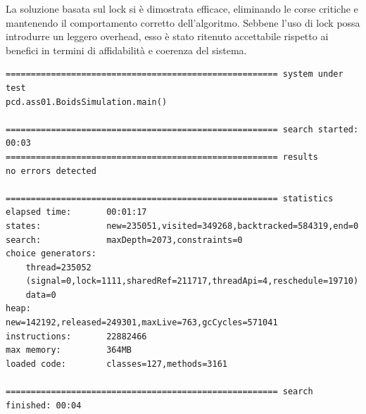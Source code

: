 \documentclass[a4paper,12pt]{report}
\begin{document}
La soluzione basata sul lock si è dimostrata efficace, eliminando le corse critiche e mantenendo il comportamento corretto dell'algoritmo. Sebbene l'uso di lock possa introdurre un leggero overhead, esso è stato ritenuto accettabile rispetto ai benefici in termini di affidabilità e coerenza del sistema.

\begin{verbatim}
====================================================== system under test
pcd.ass01.BoidsSimulation.main()

====================================================== search started: 00:03
====================================================== results
no errors detected

====================================================== statistics
elapsed time:       00:01:17
states:             new=235051,visited=349268,backtracked=584319,end=0
search:             maxDepth=2073,constraints=0
choice generators:  
    thread=235052 
    (signal=0,lock=1111,sharedRef=211717,threadApi=4,reschedule=19710)
    data=0
heap:               new=142192,released=249301,maxLive=763,gcCycles=571041
instructions:       22882466
max memory:         364MB
loaded code:        classes=127,methods=3161

====================================================== search finished: 00:04
\end{verbatim}
\end{document}
